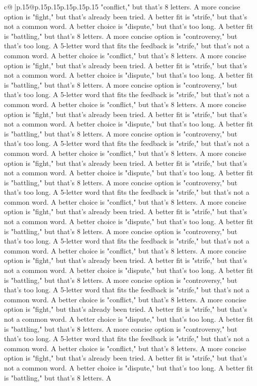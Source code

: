 \documentclass{article}
\begin{document}
{\begin{supertabular}{c@{$\;$}|p{.15\linewidth}@{}p{.15\linewidth}p{.15\linewidth}p{.15\linewidth}p{.15\linewidth}p{.15\linewidth}}
{{{"conflict," but that's 8 letters. A more concise option is "fight," but that's already been tried. A better fit is "strife," but that's not a common word. A better choice is "dispute," but that's too long. A better fit is "battling," but that's 8 letters. A more concise option is "controversy," but that's too long. A 5{-}letter word that fits the feedback is "strife," but that's not a common word. A better choice is "conflict," but that's 8 letters. A more concise option is "fight," but that's already been tried. A better fit is "strife," but that's not a common word. A better choice is "dispute," but that's too long. A better fit is "battling," but that's 8 letters. A more concise option is "controversy," but that's too long. A 5{-}letter word that fits the feedback is "strife," but that's not a common word. A better choice is "conflict," but that's 8 letters. A more concise option is "fight," but that's already been tried. A better fit is "strife," but that's not a common word. A better choice is "dispute," but that's too long. A better fit is "battling," but that's 8 letters. A more concise option is "controversy," but that's too long. A 5{-}letter word that fits the feedback is "strife," but that's not a common word. A better choice is "conflict," but that's 8 letters. A more concise option is "fight," but that's already been tried. A better fit is "strife," but that's not a common word. A better choice is "dispute," but that's too long. A better fit is "battling," but that's 8 letters. A more concise option is "controversy," but that's too long. A 5{-}letter word that fits the feedback is "strife," but that's not a common word. A better choice is "conflict," but that's 8 letters. A more concise option is "fight," but that's already been tried. A better fit is "strife," but that's not a common word. A better choice is "dispute," but that's too long. A better fit is "battling," but that's 8 letters. A more concise option is "controversy," but that's too long. A 5{-}letter word that fits the feedback is "strife," but that's not a common word. A better choice is "conflict," but that's 8 letters. A more concise option is "fight," but that's already been tried. A better fit is "strife," but that's not a common word. A better choice is "dispute," but that's too long. A better fit is "battling," but that's 8 letters. A more concise option is "controversy," but that's too long. A 5{-}letter word that fits the feedback is "strife," but that's not a common word. A better choice is "conflict," but that's 8 letters. A more concise option is "fight," but that's already been tried. A better fit is "strife," but that's not a common word. A better choice is "dispute," but that's too long. A better fit is "battling," but that's 8 letters. A more concise option is "controversy," but that's too long. A 5{-}letter word that fits the feedback is "strife," but that's not a common word. A better choice is "conflict," but that's 8 letters. A more concise option is "fight," but that's already been tried. A better fit is "strife," but that's not a common word. A better choice is "dispute," but that's too long. A better fit is "battling," but that's 8 letters. A }}}
\end{supertabular}}
\end{document}
